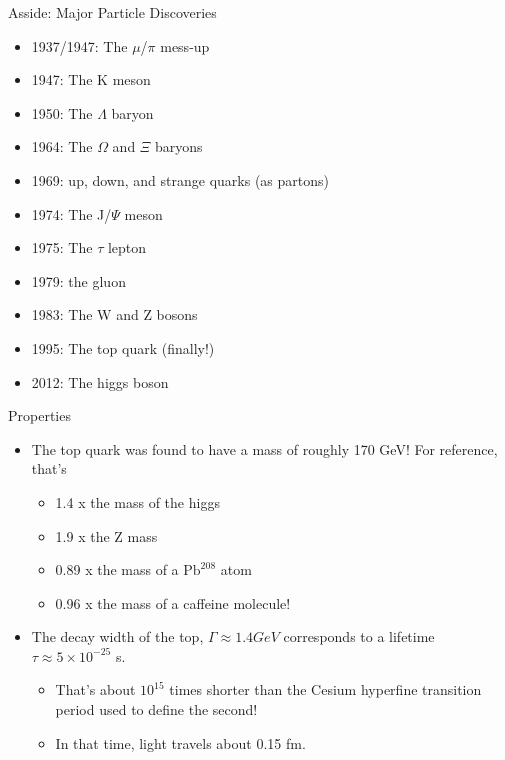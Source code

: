 \documentclass{beamer}
\begin{document}
\begin{frame}{Asside: Major Particle Discoveries}
    \begin{itemize}
        \item<1-> 1937/1947: The $\mu$/$\pi$ mess-up 
        \item<2-> 1947: The K meson
        \item<3-> 1950: The $\Lambda$ baryon
        \item<4-> 1964: The $\Omega$ and $\Xi$ baryons
        \item<5-> 1969: up, down, and strange quarks (as partons)
        \item<6-> 1974: The J/$\Psi$ meson
        \item<7-> 1975: The $\tau$ lepton
        \item<8-> 1979: the gluon
        \item<9-> 1983: The W and Z bosons
        \item<10-> 1995: The top quark (finally!)
        \item<11-> 2012: The higgs boson
    \end{itemize}
\end{frame}

\begin{frame}{Properties}
    \begin{itemize}
        \item<1-> The top quark was found to have a mass of roughly 170 GeV! For reference, that's
        \begin{itemize}
            \item<2-> 1.4 x the mass of the higgs
            \item<3-> 1.9 x the Z mass
            \item<4-> 0.89 x the mass of a $\text{Pb}^{208}$ atom
            \item<5-> 0.96 x the mass of a caffeine molecule! 
        \end{itemize}
        \item<6-> The decay width of the top, $\Gamma \approx 1.4 GeV$ corresponds to a lifetime $\tau \approx 5\times 10^{-25}$ s.
        \begin{itemize}
            \item<7-> That's about $10^{15}$ times shorter than the Cesium hyperfine transition period used to define the second!
            \item<8-> In that time, light travels about 0.15 fm.
        \end{itemize}
    \end{itemize}
\end{frame}
\end{document}
